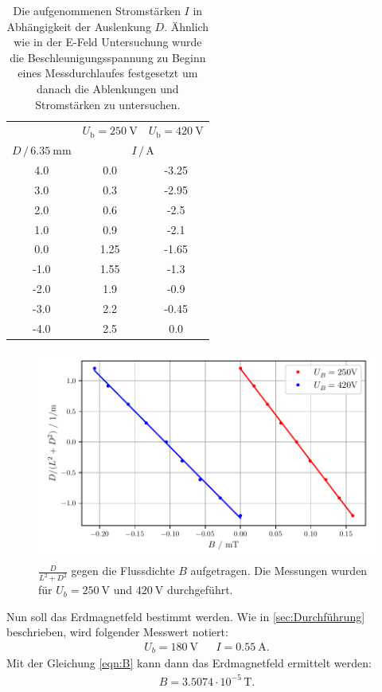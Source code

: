 \begin{table} 
    \centering
    \caption{Die aufgenommenen Stromstärken $I$ in Abhängigkeit der Auslenkung $D$.
              Ähnlich wie in der E-Feld Untersuchung wurde die Beschleunigungsspannung zu Beginn eines Messdurchlaufes festgesetzt um danach die Ablenkungen und Stromstärken zu untersuchen. } 
    \label{tab:bFeldTeil1}
    \begin{tabular}{c c c }%
    \toprule
        & $U_\text{b} = \SI{250}{\volt}$ & $U_\text{b} = \SI{420}{\volt}$\\
    \cmidrule(lr){2-3}
    $ D \, / \, \SI{6.35}{\milli\metre}$ & \multicolumn{2}{c}{$I \, / \, \si{\ampere} $ }\\
      \midrule
      4.0 & 0.0 & -3.25 \\
      3.0 & 0.3 & -2.95 \\
      2.0 & 0.6 & -2.5 \\
      1.0 & 0.9 & -2.1 \\
      0.0 & 1.25 & -1.65 \\
      -1.0 & 1.55 & -1.3 \\
      -2.0 & 1.9 & -0.9 \\
      -3.0 & 2.2 & -0.45 \\
      -4.0 & 2.5 & 0.0 \\
      \bottomrule
    \end{tabular}
  \end{table}

  \begin{figure} 
    \centering
    \includegraphics[width=\textwidth]{bilder/B_Feld_Teil_1_beide.pdf}
    \caption{$\frac{D}{L^2+D^2}$ gegen die Flussdichte $B$ aufgetragen. Die Messungen wurden für $U_b = \SI{250}{\volt}$ und $\SI{420}{\volt}$ durchgeführt.}
    \label{fig:bFeldTeil1}
\end{figure}
\noindent
Nun soll das Erdmagnetfeld bestimmt werden. Wie in \autoref{sec:Durchführung} beschrieben, wird folgender Messwert notiert:
\begin{align*}
    U_b = \SI{180}{\volt}& &I= \SI{0.55}{\ampere}.
\end{align*}
Mit der Gleichung \eqref{eqn:B} kann dann das Erdmagnetfeld ermittelt werden:
\begin{align*}
    B = 3.5074 \cdot 10^{-5} \, \si{\tesla}.
\end{align*}